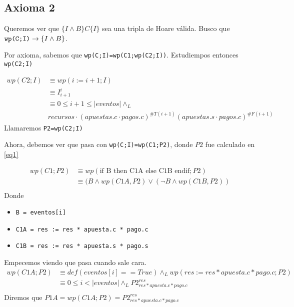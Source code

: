 \documentclass[../document.tex]{subfiles}
\begin{document}
\subsection*{Axioma 2}
Queremos ver que $\{I \land B\}C\{I\}$ sea una tripla de Hoare válida. Busco que $\verb+wp(C;I)+ \to \{I \land B\}$.

Por axioma, sabemos que \verb+wp(C;I)=wp(C1;wp(C2;I))+. Estudiempos entonces \verb|wp(C2;I)|

\begin{equation} \label{eq1}
\begin{split}
wp(C2;I) & \equiv wp(i := i+1;I) \\
         & \equiv I^{i}_{i+1} \\
         & \equiv 0\leq i+1 \leq |eventos| \land_L\\ 
         &recursos \cdot (apuestas.c\cdot pagos.c)^{\#T(i+1)}(apuestas.s\cdot pagos.c)^{\#F(i+1)}
\end{split}
\end{equation}
Llamaremos \verb|P2=wp(C2;I)|

Ahora, debemos ver que pasa con \verb+wp(C;I)=wp(C1;P2)+, donde $P2$ fue calculado en \ref{eq1}

\begin{equation} \label{eq2}
\begin{split}
wp(C1;P2) & \equiv wp(\text{if B then C1A else C1B endif};P2) \\
          & \equiv (B \land wp(C1A, P2) \lor (\neg B \land wp(C1B, P2)) \\
\end{split}
\end{equation}
Donde
\begin{itemize}
    \item \verb|B = eventos[i]|
    \item \verb|C1A = res := res * apuesta.c * pago.c|
    \item \verb|C1B = res := res * apuesta.s * pago.s|
\end{itemize}

Empecemos viendo que pasa cuando sale cara.
\begin{equation} \label{eq2.a}
\begin{split}
wp(C1A;P2) & \equiv def(eventos[i]==True) \land_{L} wp(res := res * apuesta.c * pago.c; P2) \\
           & \equiv 0\leq i<|eventos| \land_{L} P2^{res}_{res * apuesta.c * pago.c} \\
\end{split}
\end{equation}
Diremos que $P1A = wp(C1A;P2) = P2^{res}_{res * apuesta.c * pago.c}$
\end{document}
